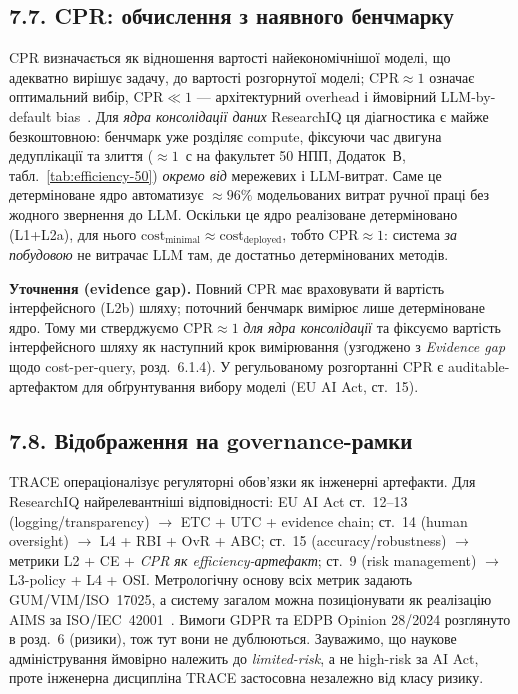 \subsection*{7.7. CPR: обчислення з наявного бенчмарку}

CPR визначається як відношення вартості найекономічнішої моделі, що адекватно вирішує задачу, до вартості розгорнутої моделі; $\mathrm{CPR}\approx 1$ означає оптимальний вибір, $\mathrm{CPR}\ll 1$ --- архітектурний overhead і ймовірний LLM-by-default bias~\cite{Zabolotnii2026TRACE}. Для \emph{ядра консолідації даних} ResearchIQ ця діагностика є майже безкоштовною: бенчмарк уже розділяє compute, фіксуючи час двигуна дедуплікації та злиття ($\approx 1$~с на факультет 50 НПП, Додаток~В, табл.~\ref{tab:efficiency-50}) \emph{окремо від} мережевих і LLM-витрат. Саме це детерміноване ядро автоматизує $\approx 96\%$ модельованих витрат ручної праці без жодного звернення до LLM. Оскільки це ядро реалізоване детерміновано (L1+L2a), для нього $\mathrm{cost}_{\mathrm{minimal}}\approx\mathrm{cost}_{\mathrm{deployed}}$, тобто $\mathrm{CPR}\approx 1$: система \emph{за побудовою} не витрачає LLM там, де достатньо детермінованих методів.

\textbf{Уточнення (evidence gap).} Повний CPR має враховувати й вартість інтерфейсного (L2b) шляху; поточний бенчмарк вимірює лише детерміноване ядро. Тому ми стверджуємо $\mathrm{CPR}\approx 1$ \emph{для ядра консолідації} та фіксуємо вартість інтерфейсного шляху як наступний крок вимірювання (узгоджено з \textit{Evidence gap} щодо cost-per-query, розд.~6.1.4). У регульованому розгортанні CPR є auditable-артефактом для обґрунтування вибору моделі (EU AI Act, ст.~15).

\subsection*{7.8. Відображення на governance-рамки}

TRACE операціоналізує регуляторні обов'язки як інженерні артефакти. Для ResearchIQ найрелевантніші відповідності: EU AI Act ст.~12--13 (logging/transparency) $\rightarrow$ ETC + UTC + evidence chain; ст.~14 (human oversight) $\rightarrow$ L4 + RBI + OvR + ABC; ст.~15 (accuracy/robustness) $\rightarrow$ метрики L2 + CE + \emph{CPR як efficiency-артефакт}; ст.~9 (risk management) $\rightarrow$ L3-policy + L4 + OSI. Метрологічну основу всіх метрик задають GUM/VIM/ISO~17025, а систему загалом можна позиціонувати як реалізацію AIMS за ISO/IEC~42001~\cite{Zabolotnii2026TRACE}. Вимоги GDPR та EDPB Opinion 28/2024 розглянуто в розд.~6 (ризики), тож тут вони не дублюються. Зауважимо, що наукове адміністрування ймовірно належить до \emph{limited-risk}, а не high-risk за AI Act, проте інженерна дисципліна TRACE застосовна незалежно від класу ризику.

